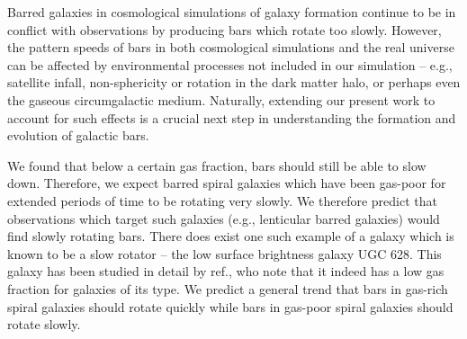 \documentclass{natureprintstyle}
\begin{document}
Barred galaxies in cosmological simulations of galaxy formation continue to be
in conflict with observations by producing bars which rotate too
slowly.\cite{2017MNRAS.469.1054A, 2019MNRAS.483.2721P, 2021AA...650L..16F}
However, the pattern speeds of bars in both cosmological simulations and the
real universe can be affected by environmental processes not included in our
simulation -- e.g., satellite infall\cite{2011Natur.477..301P},
non-sphericity\cite{2013MNRAS.429.1949A} or rotation\cite{2013MNRAS.434.1287S,
2014ApJ...783L..18L, 2018MNRAS.476.1331C, 2019MNRAS.488.5788C} in the dark
matter halo, or perhaps even the gaseous circumgalactic medium. Naturally,
extending our present work to account for such effects is a crucial next step
in understanding the formation and evolution of galactic bars.

We found that below a certain gas fraction, bars should still be able to slow
down. Therefore, we expect barred spiral galaxies which have been gas-poor for
extended periods of time to be rotating very slowly. We therefore predict that
observations which target such galaxies (e.g., lenticular barred
galaxies\cite{2009ARAA..47..159B}) would find slowly rotating bars. There does
exist one such example of a galaxy which is known to be a slow rotator -- the
low surface brightness galaxy UGC 628.\cite{2009AA...499L..25C} This galaxy
has been studied in detail by ref.\cite{2016MNRAS.463.1751C}, who note that it
indeed has a low gas fraction for galaxies of its type. We predict a general
trend that bars in gas-rich spiral galaxies should rotate quickly while bars
in gas-poor spiral galaxies should rotate slowly.




\end{document}
